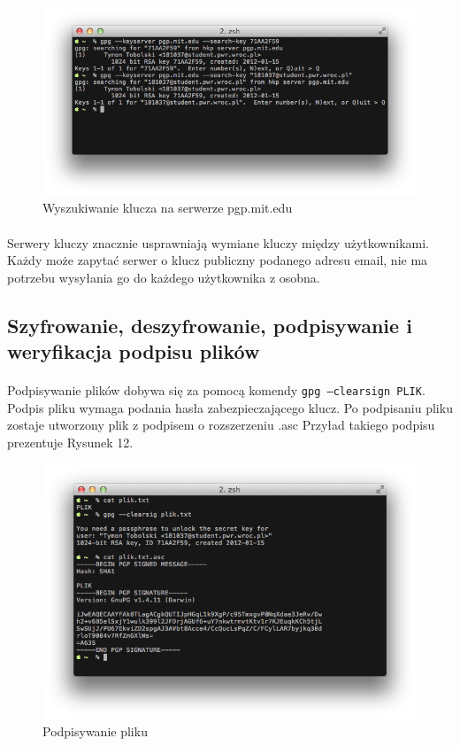 \documentclass[wide,a4paper,titlepage,12pt] {article}
\begin{document}
  \begin{figure}[h!]
    \begin{center}
      \includegraphics[width=\textwidth]{img/11.png}
      \caption{Wyszukiwanie klucza na serwerze pgp.mit.edu}
    \end{center}
  \end{figure}

  \paragraph{}
  Serwery kluczy znacznie usprawniają wymiane kluczy między użytkownikami. Każdy może zapytać serwer o klucz publiczny podanego adresu email, nie ma potrzebu wysyłania go do każdego użytkownika z osobna.

  \subsection{Szyfrowanie, deszyfrowanie, podpisywanie i weryfikacja podpisu plików}
  \paragraph{}
  Podpisywanie plików dobywa się za pomocą komendy \texttt{gpg --clearsign PLIK}. Podpis pliku wymaga podania hasła zabezpieczającego klucz. Po podpisaniu pliku zostaje utworzony plik z podpisem o rozszerzeniu .asc  Przyład takiego podpisu prezentuje Rysunek 12.

  \begin{figure}[h!]
    \begin{center}
      \includegraphics[width=\textwidth]{img/12.png}
      \caption{Podpisywanie pliku}
    \end{center}
  \end{figure}
\end{document}

